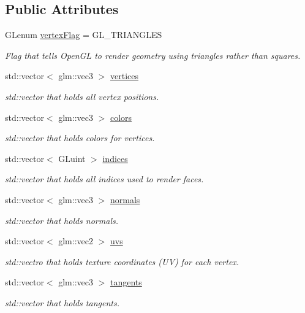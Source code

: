 \subsection*{Public Attributes}
\begin{DoxyCompactItemize}
\item 
G\+Lenum \mbox{\hyperlink{class_mesh_aa4fa174a34713f4f3286bd202d5d3617}{vertex\+Flag}} = G\+L\+\_\+\+T\+R\+I\+A\+N\+G\+L\+ES
\begin{DoxyCompactList}\small\item\em Flag that tells Open\+GL to render geometry using triangles rather than squares. \end{DoxyCompactList}\item 
std\+::vector$<$ glm\+::vec3 $>$ \mbox{\hyperlink{class_mesh_aee572fab7113a18cf174a8418394aef4}{vertices}}
\begin{DoxyCompactList}\small\item\em std\+::vector that holds all vertex positions. \end{DoxyCompactList}\item 
std\+::vector$<$ glm\+::vec3 $>$ \mbox{\hyperlink{class_mesh_a484b6f05575dbac43b3f5de817f90069}{colors}}
\begin{DoxyCompactList}\small\item\em std\+::vector that holds colors for vertices. \end{DoxyCompactList}\item 
std\+::vector$<$ G\+Luint $>$ \mbox{\hyperlink{class_mesh_a5e55b84c6c967608bcf23ed7d68e4215}{indices}}
\begin{DoxyCompactList}\small\item\em std\+::vector that holds all indices used to render faces. \end{DoxyCompactList}\item 
std\+::vector$<$ glm\+::vec3 $>$ \mbox{\hyperlink{class_mesh_a51622ff35f286e2015954aad76ee4bc2}{normals}}
\begin{DoxyCompactList}\small\item\em std\+::vector that holds normals. \end{DoxyCompactList}\item 
std\+::vector$<$ glm\+::vec2 $>$ \mbox{\hyperlink{class_mesh_af98b594a339f9e92ed0a4e1e4d84a6d9}{uvs}}
\begin{DoxyCompactList}\small\item\em std\+::vectro that holds texture coordinates (UV) for each vertex. \end{DoxyCompactList}\item 
std\+::vector$<$ glm\+::vec3 $>$ \mbox{\hyperlink{class_mesh_aabfc88c0c59371aca2d8fe6227a1c3f1}{tangents}}
\begin{DoxyCompactList}\small\item\em std\+::vector that holds tangents. \end{DoxyCompactList}\end{DoxyCompactItemize}


